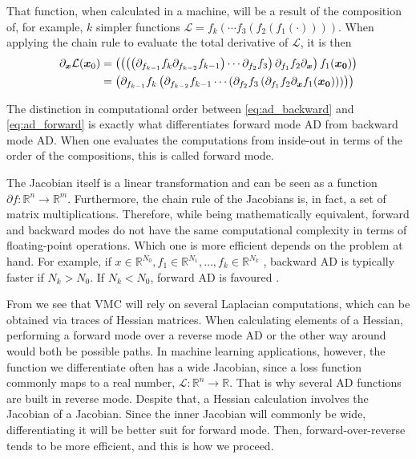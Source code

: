 That function, when calculated in a machine, will be a result of the composition of, for example, $k$ simpler functions $\mathcal{L} = f_k(\cdots f_3(f_2(f_1(\cdot))))$. When applying the chain rule to evaluate the total derivative of $\mathcal{L}$, it is then
\begin{align}
    \partial_{\boldsymbol{x}} \mathcal{L} (\boldsymbol{x}_0) &= \left(\left(\left(\left(\partial_{f_{k-1}} f_k  \partial_{f_{k-2}} f_{k-1} \right)\cdots \partial_{f_{2}} f_{3}\right) \partial_{f_{1}} f_{2}\partial_{\boldsymbol{x}}\right) f_{1}(\boldsymbol{x_0})\right) \label{eq:ad_backward}\\
    &=\left(\partial_{f_{k-1}} f_k \left( \partial_{f_{k-2}} f_{k-1} \cdots \left(\partial_{f_{2}} f_{3} \left(\partial_{f_{1}} f_{2}\partial_{\boldsymbol{x}} f_{1}(\boldsymbol{x_0})\right)\right)\right)\right)\label{eq:ad_forward}
\end{align}

The distinction in computational order between \eqref{eq:ad_backward} and \eqref{eq:ad_forward} is exactly what differentiates forward mode AD from backward mode AD.
When one evaluates the computations from inside-out in terms of the order of the compositions, this is called forward mode. 

The Jacobian itself is a linear transformation and can be seen as a function $\partial f :\mathbb{R}^n \to \mathbb{R}^m$. Furthermore, the chain rule of the Jacobians is, in fact, a set of matrix multiplications. Therefore, while being mathematically equivalent, forward and backward modes do not have the same computational complexity in terms of floating-point operations. Which one is more efficient depends on the problem at hand. For example, if $x\in \mathbb R^{N_0}, f_1\in\mathbb R^{N_1}, \dots, f_k\in\mathbb R^{N_k}$
, backward AD is typically faster if $N_k >N_0$. If $N_k < N_0$, forward AD is favoured \cite{bradbury2018jax}.

From  we see that VMC will rely on several Laplacian computations, which can be obtained via traces of Hessian matrices. When calculating elements of a Hessian, performing a forward mode over a reverse mode AD or the other way around would both be possible paths. In machine learning applications, however, the function we differentiate often has a wide Jacobian, since a loss function commonly maps to a real number, $\mathcal{L}: \mathbb{R}^n \to \mathbb{R}$. That is why several AD functions are built in reverse mode. Despite that, a Hessian calculation involves the Jacobian of a Jacobian. Since the inner Jacobian will commonly be wide, differentiating it will be better suit for forward mode. Then, forward-over-reverse tends to be more efficient, and this is how we proceed. 

